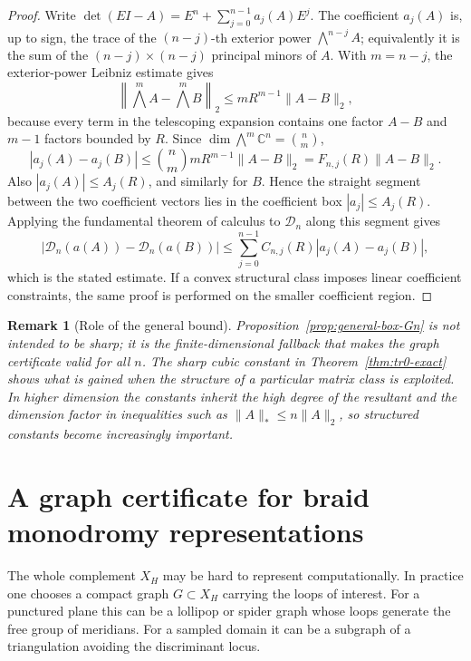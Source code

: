\documentclass[11pt]{article}
\newtheorem{remark}[theorem]{Remark}
\numberwithin{equation}{section}
\begin{document}
\begin{proof}
Write
\(\det(EI-A)=E^n+\sum_{j=0}^{n-1}a_j(A)E^j\).  The coefficient \(a_j(A)\) is, up to sign, the trace of the
\((n-j)\)-th exterior power \(\bigwedge^{n-j}A\); equivalently it is the
sum of the \((n-j)\times(n-j)\) principal minors of \(A\).  With
\(m=n-j\), the exterior-power Leibniz estimate gives
\[
 \left\|\bigwedge^m A-\bigwedge^m B\right\|_2
 \le mR^{m-1}\|A-B\|_2,
\]
because every term in the telescoping expansion contains one factor
\(A-B\) and \(m-1\) factors bounded by \(R\).  Since
\(\dim \bigwedge^m\mathbb C^n=\binom n m\),
\[
  |a_j(A)-a_j(B)|
  \le \binom n m mR^{m-1}\|A-B\|_2
  =F_{n,j}(R)\|A-B\|_2.
\]
Also \(|a_j(A)|\le A_j(R)\), and similarly for \(B\).  Hence the straight
segment between the two coefficient vectors lies in the coefficient box
\(|a_j|\le A_j(R)\).  Applying the fundamental theorem of calculus to
\(\mathcal D_n\) along this segment gives
\[
 |\mathcal D_n(a(A))-\mathcal D_n(a(B))|
 \le \sum_{j=0}^{n-1}C_{n,j}(R)|a_j(A)-a_j(B)|,
\]
which is the stated estimate.  If a convex structural class imposes linear
coefficient constraints, the same proof is performed on the smaller
coefficient region.
\end{proof}

\begin{remark}[Role of the general bound]
Proposition~\ref{prop:general-box-Gn} is not intended to be sharp; it is the
finite-dimensional fallback that makes the graph certificate valid for all
\(n\).  The sharp cubic constant in Theorem~\ref{thm:tr0-exact} shows what is
gained when the structure of a particular matrix class is exploited.  In
higher dimension the constants inherit the high degree of the resultant and
the dimension factor in inequalities such as \(\|A\|_*\le n\|A\|_2\), so
structured constants become increasingly important.
\end{remark}

\section{A graph certificate for braid monodromy representations}\label{sec:graph}

The whole complement $X_H$ may be hard to represent computationally.  In
practice one chooses a compact graph $G\subset X_H$ carrying the loops of
interest.  For a punctured plane this can be a lollipop or spider graph
whose loops generate the free group of meridians.  For a sampled domain it
can be a subgraph of a triangulation avoiding the discriminant locus.
\end{document}
